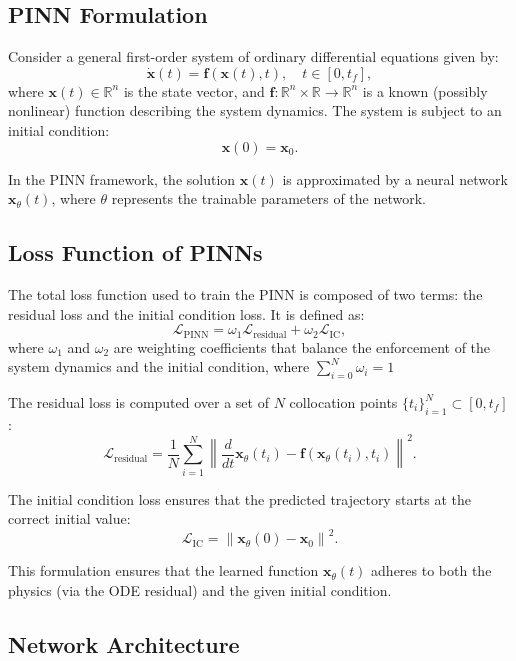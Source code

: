 \subsection{PINN Formulation}

Consider a general first-order system of ordinary differential equations given by:
\[
\dot{\mathbf{x}}(t) = \mathbf{f}(\mathbf{x}(t), t), \quad t \in [0, t_f],
\]
where \( \mathbf{x}(t) \in \mathbb{R}^n \) is the state vector, and \( \mathbf{f} : \mathbb{R}^n \times \mathbb{R} \rightarrow \mathbb{R}^n \) is a known (possibly nonlinear) function describing the system dynamics. The system is subject to an initial condition:
\[
\mathbf{x}(0) = \mathbf{x}_0.
\]

In the PINN framework, the solution \( \mathbf{x}(t) \) is approximated by a neural network \( \mathbf{x}_{\theta}(t) \), where \( \theta \) represents the trainable parameters of the network.

\subsection{Loss Function of PINNs}

The total loss function used to train the PINN is composed of two terms: the residual loss and the initial condition loss. It is defined as:
\[
\mathcal{L}_{\text{PINN}} = \omega_1 \mathcal{L}_{\text{residual}} + \omega_2 \mathcal{L}_{\text{IC}},
\]
where \( \omega_1 \) and \( \omega_2 \) are weighting coefficients that balance the enforcement of the system dynamics and the initial condition, where $\sum_{i=0}^{N}\omega_i = 1$

The residual loss is computed over a set of \( N \) collocation points \( \{t_i\}_{i=1}^{N} \subset [0, t_f] \):
\[
\mathcal{L}_{\text{residual}} = \frac{1}{N} \sum_{i=1}^{N} \left\| \frac{d}{dt} \mathbf{x}_{\theta}(t_i) - \mathbf{f}(\mathbf{x}_{\theta}(t_i), t_i) \right\|^2.
\]

The initial condition loss ensures that the predicted trajectory starts at the correct initial value:
\[
\mathcal{L}_{\text{IC}} = \left\| \mathbf{x}_{\theta}(0) - \mathbf{x}_0 \right\|^2.
\]

This formulation ensures that the learned function \( \mathbf{x}_{\theta}(t) \) adheres to both the physics (via the ODE residual) and the given initial condition.

\subsection{Network Architecture}

